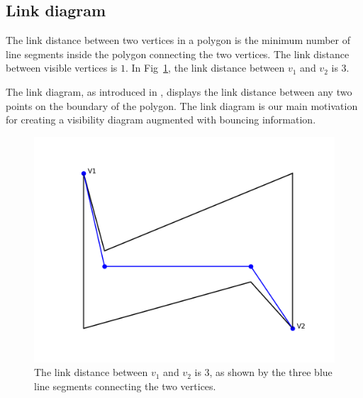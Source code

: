\documentclass[]{styles/svproc}  %
\begin{document}
%    





\subsection{Link diagram}

The link distance between two vertices in a polygon is the minimum number of line segments inside the polygon connecting the two vertices. The link distance between visible vertices is $1$. In Fig~\ref{fig:link_dis}, the link distance between $v_1$ and $v_2$ is 3.

The link diagram, as introduced in \cite{tan_sweep}, displays the link distance between any two points on the boundary of the polygon. The link diagram is our main motivation for creating a visibility diagram augmented with bouncing information.
\begin{figure}
    \includegraphics[width=0.6\linewidth]{figures/link_distance.png}
    \centering
    \caption{The link distance between $v_1$ and $v_2$ is 3, as shown by the three blue line segments connecting the two vertices.}\label{fig:link_dis}
    \centering
\end{figure}
\end{document}
